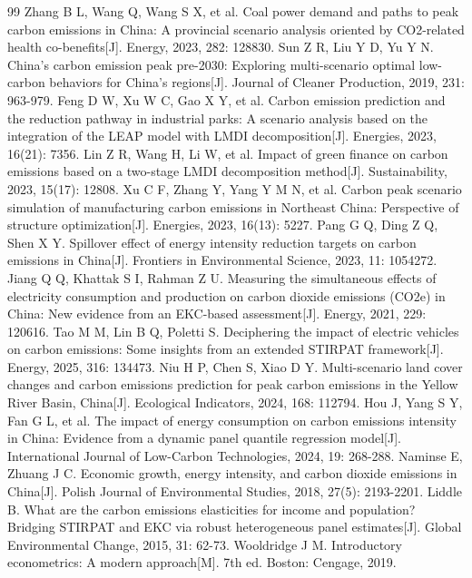 \documentclass[12pt,a4paper]{ctexart}
\begin{document}
\begin{thebibliography}{99}
 Zhang B L, Wang Q, Wang S X, et al. Coal power demand and paths to peak carbon emissions in China: A provincial scenario analysis oriented by CO2-related health co-benefits[J]. Energy, 2023, 282: 128830.
 Sun Z R, Liu Y D, Yu Y N. China's carbon emission peak pre-2030: Exploring multi-scenario optimal low-carbon behaviors for China's regions[J]. Journal of Cleaner Production, 2019, 231: 963-979.
 Feng D W, Xu W C, Gao X Y, et al. Carbon emission prediction and the reduction pathway in industrial parks: A scenario analysis based on the integration of the LEAP model with LMDI decomposition[J]. Energies, 2023, 16(21): 7356.
 Lin Z R, Wang H, Li W, et al. Impact of green finance on carbon emissions based on a two-stage LMDI decomposition method[J]. Sustainability, 2023, 15(17): 12808.
 Xu C F, Zhang Y, Yang Y M N, et al. Carbon peak scenario simulation of manufacturing carbon emissions in Northeast China: Perspective of structure optimization[J]. Energies, 2023, 16(13): 5227.
 Pang G Q, Ding Z Q, Shen X Y. Spillover effect of energy intensity reduction targets on carbon emissions in China[J]. Frontiers in Environmental Science, 2023, 11: 1054272.
 Jiang Q Q, Khattak S I, Rahman Z U. Measuring the simultaneous effects of electricity consumption and production on carbon dioxide emissions (CO2e) in China: New evidence from an EKC-based assessment[J]. Energy, 2021, 229: 120616.
 Tao M M, Lin B Q, Poletti S. Deciphering the impact of electric vehicles on carbon emissions: Some insights from an extended STIRPAT framework[J]. Energy, 2025, 316: 134473.
 Niu H P, Chen S, Xiao D Y. Multi-scenario land cover changes and carbon emissions prediction for peak carbon emissions in the Yellow River Basin, China[J]. Ecological Indicators, 2024, 168: 112794.
 Hou J, Yang S Y, Fan G L, et al. The impact of energy consumption on carbon emissions intensity in China: Evidence from a dynamic panel quantile regression model[J]. International Journal of Low-Carbon Technologies, 2024, 19: 268-288.
 Naminse E, Zhuang J C. Economic growth, energy intensity, and carbon dioxide emissions in China[J]. Polish Journal of Environmental Studies, 2018, 27(5): 2193-2201.
 Liddle B. What are the carbon emissions elasticities for income and population? Bridging STIRPAT and EKC via robust heterogeneous panel estimates[J]. Global Environmental Change, 2015, 31: 62-73.
 Wooldridge J M. Introductory econometrics: A modern approach[M]. 7th ed. Boston: Cengage, 2019.
\end{thebibliography}


\end{document}
